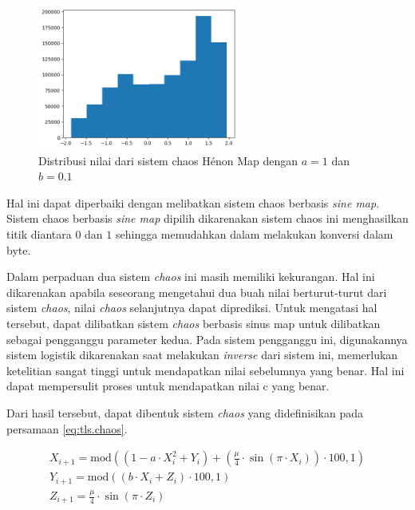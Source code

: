 \begin{figure}[!h]
  \centering
  \includegraphics[width=250px]{chapters/res/chapter-3/img/henon.distribution.png}
  \caption{Distribusi nilai dari sistem chaos Hénon Map dengan $a=1$ dan $b=0.1$} \label{fig:chaos.henon.distribution}
\end{figure}

Hal ini dapat diperbaiki dengan melibatkan sistem chaos berbasis \emph{sine map}. Sistem chaos berbasis \emph{sine map} dipilih dikarenakan sistem chaos ini menghasilkan titik diantara $0$ dan $1$ sehingga memudahkan dalam melakukan konversi dalam byte.

Dalam perpaduan dua sistem \emph{chaos} ini masih memiliki kekurangan. Hal ini dikarenakan apabila seseorang mengetahui dua buah nilai berturut-turut dari sistem \emph{chaos}, nilai \emph{chaos} selanjutnya dapat diprediksi. Untuk mengatasi hal tersebut, dapat dilibatkan sistem \emph{chaos} berbasis sinus map untuk dilibatkan sebagai pengganggu parameter kedua. Pada sistem pengganggu ini, digunakannya sistem logistik dikarenakan saat melakukan \emph{inverse} dari sistem ini, memerlukan ketelitian sangat tinggi untuk mendapatkan nilai sebelumnya yang benar. Hal ini dapat mempersulit proses untuk mendapatkan nilai c yang benar. %

Dari hasil tersebut, dapat dibentuk sistem \emph{chaos} yang didefinisikan pada persamaan \ref{eq:tls.chaos}.

\begin{equation}
  \begin{aligned}
    X_{i+1} = \text{mod}((1 - a \cdot X_i^2 + Y_i) + (\frac{\mu}{4} \cdot \sin{(\pi \cdot X_{i})}) \cdot 100, 1)  \\
    Y_{i+1} = \text{mod}((b \cdot X_i + Z_{i}) \cdot 100, 1) \\
    Z_{i+1} = \frac{\mu}{4} \cdot \sin{(\pi \cdot Z_{i})}
  \end{aligned}
  \label{eq:tls.chaos}
\end{equation}

